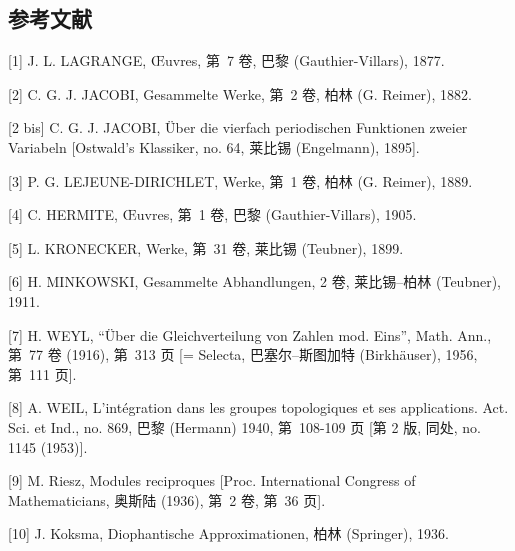 \subsection*{参考文献}

{[}1{]} J. L. LAGRANGE, Œuvres, 第~7 卷, 巴黎 (Gauthier-Villars), 1877.

{[}2{]} C. G. J. JACOBI, Gesammelte Werke, 第~2 卷, 柏林 (G. Reimer), 1882.

{[}2 bis{]} C. G. J. JACOBI, Über die vierfach periodischen Funktionen zweier Variabeln {[}Ostwald's Klassiker, no. 64, 莱比锡 (Engelmann), 1895{]}.

{[}3{]} P. G. LEJEUNE-DIRICHLET, Werke, 第~1 卷, 柏林 (G. Reimer), 1889.

{[}4{]} C. HERMITE, Œuvres, 第~1 卷, 巴黎 (Gauthier-Villars), 1905.

{[}5{]} L. KRONECKER, Werke, 第~31 卷, 莱比锡 (Teubner), 1899.

{[}6{]} H. MINKOWSKI, Gesammelte Abhandlungen, 2 卷, 莱比锡–柏林 (Teubner), 1911.

{[}7{]} H. WEYL, ``Über die Gleichverteilung von Zahlen mod. Eins'', Math. Ann., 第~77 卷 (1916), 第~313 页 {[}= Selecta, 巴塞尔–斯图加特 (Birkhäuser), 1956, 第~111 页{]}.

{[}8{]} A. WEIL, L'intégration dans les groupes topologiques et ses applications. Act. Sci. et Ind., no. 869, 巴黎 (Hermann) 1940, 第~108-109 页 {[}第 2 版, 同处, no. 1145 (1953){]}.

{[}9{]} M. Riesz, Modules reciproques {[}Proc. International Congress of Mathematicians, 奥斯陆 (1936), 第~2 卷, 第~36 页{]}.

{[}10{]} J. Koksma, Diophantische Approximationen, 柏林 (Springer), 1936.

